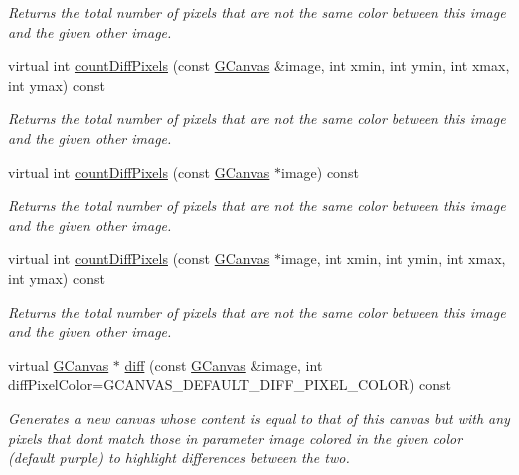 \begin{DoxyCompactItemize}
\begin{DoxyCompactList}\small\item\em Returns the total number of pixels that are not the same color between this image and the given other image. \end{DoxyCompactList}\item 
virtual int \mbox{\hyperlink{classGCanvas_a3ed6edef8ed522bbfc09d8f6005d6d8e}{count\+Diff\+Pixels}} (const \mbox{\hyperlink{classGCanvas}{G\+Canvas}} \&image, int xmin, int ymin, int xmax, int ymax) const
\begin{DoxyCompactList}\small\item\em Returns the total number of pixels that are not the same color between this image and the given other image. \end{DoxyCompactList}\item 
virtual int \mbox{\hyperlink{classGCanvas_a443b0f63a197c0f1147b13077f4206e0}{count\+Diff\+Pixels}} (const \mbox{\hyperlink{classGCanvas}{G\+Canvas}} $\ast$image) const
\begin{DoxyCompactList}\small\item\em Returns the total number of pixels that are not the same color between this image and the given other image. \end{DoxyCompactList}\item 
virtual int \mbox{\hyperlink{classGCanvas_a77b38a94630c93ecc697fb12a1fb89fd}{count\+Diff\+Pixels}} (const \mbox{\hyperlink{classGCanvas}{G\+Canvas}} $\ast$image, int xmin, int ymin, int xmax, int ymax) const
\begin{DoxyCompactList}\small\item\em Returns the total number of pixels that are not the same color between this image and the given other image. \end{DoxyCompactList}\item 
virtual \mbox{\hyperlink{classGCanvas}{G\+Canvas}} $\ast$ \mbox{\hyperlink{classGCanvas_aa4e74e40eebb70c9616065056de5c4ca}{diff}} (const \mbox{\hyperlink{classGCanvas}{G\+Canvas}} \&image, int diff\+Pixel\+Color=G\+C\+A\+N\+V\+A\+S\+\_\+\+D\+E\+F\+A\+U\+L\+T\+\_\+\+D\+I\+F\+F\+\_\+\+P\+I\+X\+E\+L\+\_\+\+C\+O\+L\+OR) const
\begin{DoxyCompactList}\small\item\em Generates a new canvas whose content is equal to that of this canvas but with any pixels that don\textquotesingle{}t match those in parameter \textquotesingle{}image\textquotesingle{} colored in the given color (default purple) to highlight differences between the two. \end{DoxyCompactList}\item 

\end{DoxyCompactItemize}
